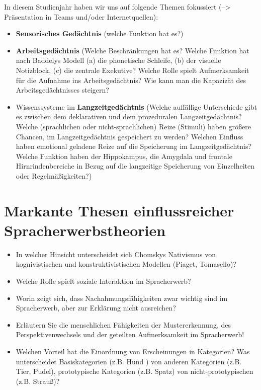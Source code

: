 \documentclass[
  letterpaper,
]{scrbook}
\begin{document}
In diesem Studienjahr haben wir uns auf folgende Themen fokussiert
(--\textgreater{} Präsentation in Teams und/oder Internetquellen):

\begin{itemize}
\item
  \textbf{Sensorisches Gedächtnis} (welche Funktion hat es?)
\item
  \textbf{Arbeitsgedächtnis} (Welche Beschränkungen hat es? Welche
  Funktion hat nach Baddelys Modell (a) die phonetische Schleife, (b)
  der visuelle Notizblock, (c) die zentrale Exekutive? Welche Rolle
  spielt Aufmerksamkeit für die Aufnahme ins Arbeitsgedächtnis? Wie kann
  man die Kapazizät des Arbeitsgedächtnisses steigern?
\item
  Wissenssysteme im \textbf{Langzeitgedächtnis} (Welche auffällige
  Unterschiede gibt es zwischen dem deklarativen und dem prozeduralen
  Langzeitgedächtnis? Welche (sprachlichen oder nicht-sprachlichen)
  Reize (Stimuli) haben größere Chancen, im Langzeitgedächtnis
  gespeichert zu werden? Welchen Einfluss haben emotional geladene Reize
  auf die Speicherung im Langzeitgedächtnis? Welche Funktion haben der
  Hippokampus, die Amygdala und frontale Hirnrindenbereiche in Bezug auf
  die langzeitige Speicherung von Einzelheiten oder Regelmäßigkeiten?)
\end{itemize}

\hypertarget{sec-theorien}{%
\chapter{Markante Thesen einflussreicher
Spracherwerbstheorien}\label{sec-theorien}}

\begin{itemize}
\item
  In welcher Hinsicht unterscheidet sich Chomskys Nativismus von
  kognivistischen und konstruktivistischen Modellen (Piaget, Tomasello)?
\item
  Welche Rolle spielt soziale Interaktion im Spracherwerb?
\item
  Worin zeigt sich, dass Nachahmungsfähigkeiten zwar wichtig sind im
  Spracherwerb, aber zur Erklärung nicht ausreichen?
\item
  Erläutern Sie die menschlichen Fähigkeiten der Mustererkennung, des
  Perspektivenwechsels und der geteilten Aufmerksamkeit im Spracherwerb!
\item
  Welchen Vorteil hat die Einordnung von Erscheinungen in Kategorien?
  Was unterscheidet Basiskategorien (z.B. Hund ) von anderen Kategorien
  (z.B. Tier, Pudel), prototypische Kategorien (z.B. Spatz) von
  nicht-prototypischen (z.B. Strauß)?
\end{itemize}
\end{document}
